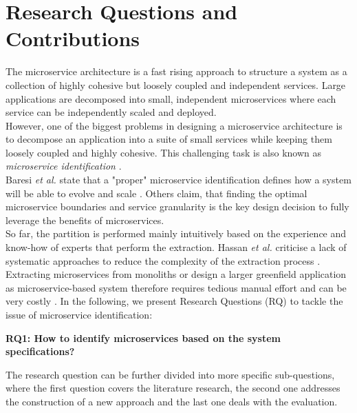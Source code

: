 \section{Research Questions and Contributions}
\label{sec:Introduction:ResearchQuestions}
The microservice architecture is a fast rising approach to structure a system as a collection of highly cohesive but loosely coupled and independent services. Large applications are decomposed into small, independent microservices where each service can be independently scaled and deployed. 
\\
However, one of the biggest problems in designing a microservice architecture is to decompose an application into a suite of small services while keeping them loosely coupled and highly cohesive. This challenging task is also known as \textit{microservice identification} \cite{ObjectAwareAmiri}. \\
Baresi \textit{et al.} state that a "proper" microservice identification defines how a system will be able to evolve and scale \cite{interfaceAnalysisBaresi}. Others claim, that finding the optimal microservice boundaries \cite{ClassificationOfRefactoring} and service granularity  \cite{ArchitecturalMetaModelling} is the key design decision to fully leverage the benefits of microservices. 
\\
So far, the partition is performed mainly intuitively based on the experience and know-how of experts that perform the extraction. Hassan \textit{et al.} criticise a lack of systematic approaches to reduce the complexity of the extraction process \cite{ArchitecturalMetaModelling}. Extracting microservices from monoliths or design a larger greenfield application as microservice-based system therefore requires tedious manual effort and can be very costly \cite{FunctionalDecompositionHeinrich} \cite{ExtractionMazlami}. In the following, we present Research Questions (RQ) to tackle the issue of microservice identification:


\vspace{0.5cm}
\par
\begingroup
\leftskip=1cm
\rightskip=1cm

\noindent
\textbf{RQ1: How to identify microservices based on the system specifications?}

\vspace{0.2cm}
\noindent
The research question can be further divided into more specific sub-questions, where the first question covers the literature research, the second one addresses the construction of a new approach and the last one deals with the evaluation.

